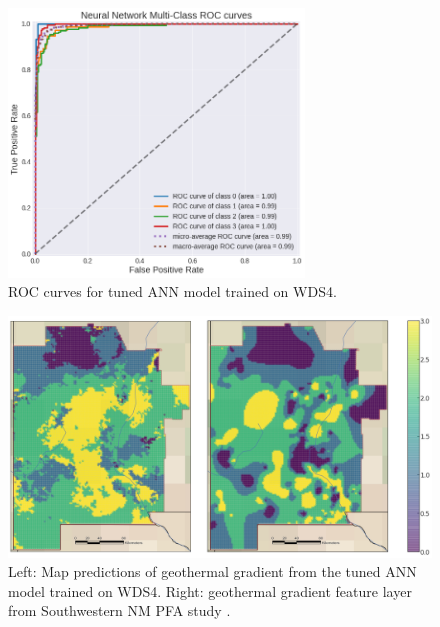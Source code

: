 \begin{figure}[htp]
\centering
\includegraphics[width=0.7\textwidth]{templates/images/Figure-NN-AUC.png}
\caption[Neural network ROC curves]{ROC curves for tuned ANN model trained on WDS4.}
\label{fig:nn_auc}
\end{figure}

\begin{figure}[!htp]
\centering
\includegraphics[width=\textwidth]{templates/images/Figure-NN-FinalMap_Joint.png}
\caption[Neural network prediction map]{Left: Map predictions of geothermal gradient from the tuned ANN model trained on WDS4. Right: geothermal gradient feature layer from Southwestern NM PFA study \protect\citep{bielicki_hydrogeolgic_2015}.}
\label{fig:nn_final_map}
\end{figure}

